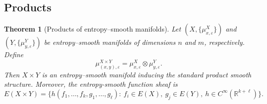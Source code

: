 \documentclass[11pt]{amsart}
\newtheorem{theorem}{Theorem}[section]
\theoremstyle{definition}
\theoremstyle{remark}
\begin{document}
\subsection{Products}

\begin{theorem}[Products of entropy--smooth manifolds]
\label{prop:products}
Let $(X,\{\mu^X_{x,\varepsilon}\})$ and $(Y,\{\mu^Y_{y,\varepsilon}\})$ be
entropy--smooth manifolds of dimensions $n$ and $m$, respectively.  Define
\[
\mu^{X\times Y}_{(x,y),\varepsilon}
= \mu^X_{x,\varepsilon} \otimes \mu^Y_{y,\varepsilon}.
\]
Then $X\times Y$ is an entropy--smooth manifold inducing the standard
product smooth structure.  Moreover, the entropy-smooth function sheaf is 
\[
 E(X\times Y)
=
\bigl\{
h(f_1,\dots,f_k,g_1,\dots,g_\ell)
:\ f_i\in  E(X),\ g_j\in E(Y),\
h\in C^\infty(\mathbb{R}^{k+\ell})
\bigr\}.
\]
\end{theorem}
\end{document}
